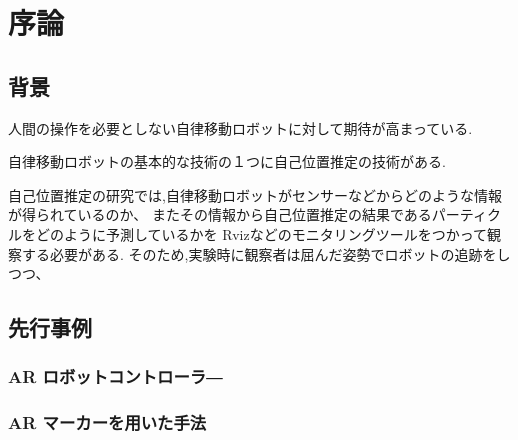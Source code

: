 \chapter{序論}

\section{背景}
人間の操作を必要としない自律移動ロボットに対して期待が高まっている.

自律移動ロボットの基本的な技術の１つに自己位置推定の技術がある.

自己位置推定の研究では,自律移動ロボットがセンサーなどからどのような情報が得られているのか、
またその情報から自己位置推定の結果であるパーティクルをどのように予測しているかを
Rvizなどのモニタリングツールをつかって観察する必要がある.
そのため,実験時に観察者は屈んだ姿勢でロボットの追跡をしつつ、



\section{先行事例}

\subsection{AR ロボットコントローラ―}

\subsection{AR マーカーを用いた手法}
